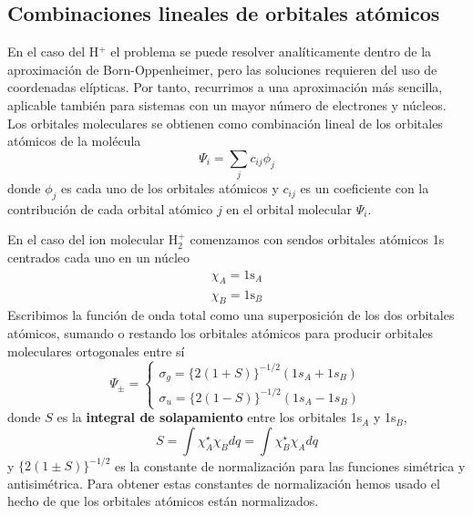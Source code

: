 \documentclass{tufte-handout}
\begin{document}
\subsection{Combinaciones lineales de orbitales atómicos}
En el caso del H$^+$ el problema se puede
resolver analíticamente dentro de la aproximación de 
Born-Oppenheimer, pero las soluciones requieren del uso de
coordenadas elípticas.
Por tanto, recurrimos a una aproximación más sencilla, 
aplicable también para sistemas con un mayor número
de electrones y núcleos. Los orbitales 
moleculares se obtienen como combinación
lineal de los orbitales atómicos de la molécula
\begin{equation}
\Psi_i=\sum_jc_{ij}\phi_j
\end{equation}
donde $\phi_j$ es cada uno de los orbitales atómicos y 
$c_{ij}$ es un coeficiente con la contribución de cada
orbital atómico $j$ en el orbital molecular $\Psi_i$.

En el caso del ion molecular H$_2^+$ comenzamos con sendos 
orbitales atómicos 1s centrados cada uno en un núcleo
\begin{gather*}
    \chi_A =\textrm{1s}_A\\
    \chi_B=\textrm{1s}_B
\end{gather*}
Escribimos la función de onda total como una
superposición de los dos orbitales atómicos, sumando o 
restando los orbitales atómicos para producir orbitales
moleculares ortogonales entre sí
\begin{equation}
\Psi_\pm = %
\begin{cases}
\sigma_g=\{2(1+S)\}^{-1/2}(1s_A+1s_B)\\
\sigma_u=\{2(1-S)\}^{-1/2}(1s_A-1s_B)
\end{cases}
\end{equation}
donde $S$ es la \textbf{integral de solapamiento}
entre los orbitales 1s$_A$ y 1s$_B$,
\begin{equation}
    S=\int\chi_A^\star\chi_Bdq=\int\chi_B^\star\chi_Adq
\end{equation}
y $\{2(1\pm S)\}^{-1/2}$ es la constante de
normalización para las funciones simétrica y 
antisimétrica.
Para obtener estas constantes de normalización hemos usado 
el hecho de que los orbitales atómicos están normalizados.
\end{document}
